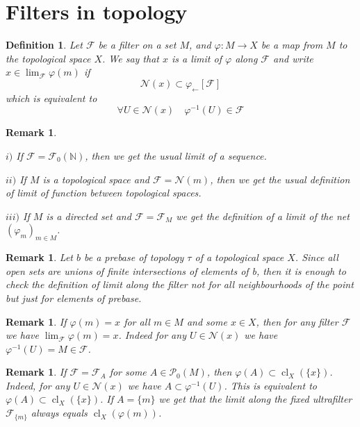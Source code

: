 \documentclass[12pt]{article}
\newtheorem{remark}[theorem]{Remark}
\newtheorem{definition}[theorem]{Definition}
\begin{document}
\section{Filters in topology}

\begin{definition}\label{DefLimitAlongFilter} Let $\mathcal{F}$ be a filter on  a set $M$, and $\varphi:M\to X$ be a map from $M$ to the topological space $X$. We say that $x$ is a limit of $\varphi$ along $\mathcal{F}$ and write $x\in\lim_{\mathcal{F}} \varphi(m)$ if
$$
\mathcal{N}(x)\subset \varphi_{\leftarrow}[\mathcal{F}]
$$
which is equivalent to
$$
\forall U\in\mathcal{N}(x)\quad \varphi^{-1}(U)\in\mathcal{F}
$$
\end{definition}

\begin{remark}\label{RemReductionFromLimitAlongFilter}

$i)$ If $\mathcal{F}=\mathcal{F}_0(\mathbb{N})$, then we get the usual limit of a sequence. 

$ii)$ If $M$ is a topological space and $\mathcal{F}=\mathcal{N}(m)$, then we get the usual definition of limit of function between topological spaces.

$iii)$ If $M$ is a directed set and $\mathcal{F}=\mathcal{F}_M$ we get the definition of a limit of the net $(\varphi_m)_{m\in M}$.
\end{remark}

\begin{remark}\label{RemOnCheckingTheDefinitionOfLimit} Let $b$ be a prebase of topology $\tau$ of a topological space $X$. Since all open sets are unions of finite intersections of elements of b, then it is enough to check the definition of limit along the filter not for all neighbourhoods of the point but just for elements of prebase.
\end{remark}

\begin{remark}\label{RemLimitOfAConst} If $\varphi(m)=x$ for all $m\in M$ and some $x\in X$, then for any filter $\mathcal{F}$ we have $\lim_{\mathcal{F}}\varphi(m)=x$. Indeed for any $U\in\mathcal{N}(x)$ we have $\varphi^{-1}(U)=M\in\mathcal{F}$.
\end{remark}

\begin{remark}\label{RemLimitAlongFilterGeneratedByASet} If $\mathcal{F}=\mathcal{F}_A$ for some $A\in\mathcal{P}_0(M)$, then $\varphi(A)\subset \operatorname{cl}_X(\{x\})$. Indeed, for any $U\in\mathcal{N}(x)$ we have $A\subset\varphi^{-1}(U)$. This is equivalent to $\varphi(A)\subset\operatorname{cl}_X(\{x\})$. If $A=\{m\}$ we get that the limit along the fixed ultrafilter $\mathcal{F}_{\{m\}}$ always equals $\operatorname{cl}_X(\varphi(m))$.
\end{remark}
\end{document}
